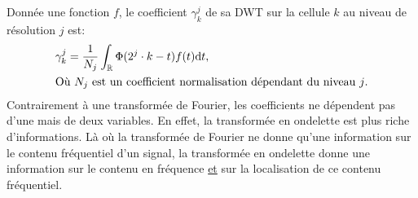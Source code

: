         \begin{definition} Donnée une fonction $f$,
            le coefficient $\gamma_k^j$ de sa DWT sur la cellule $k$ au niveau de résolution $j$ est:
            \begin{align}
                &\gamma_k^j = \frac{1}{N_j} \int_\mathbb{R} \Phi(2^j\cdot k - t)f(t) \text{d} t,\\\notag
                &\text{Où $N_j$ est un coefficient normalisation dépendant du niveau $j$.}
            \end{align}
            Contrairement à une transformée de Fourier, les coefficients ne dépendent pas d'une mais de deux variables. En effet, 
            la transformée en ondelette est plus riche d'informations. Là où la transformée de Fourier ne donne qu'une information 
            sur le contenu fréquentiel d'un signal, la transformée en ondelette donne une information sur le contenu en fréquence \underline{et}
            sur la localisation de ce contenu fréquentiel.
        \end{definition}

